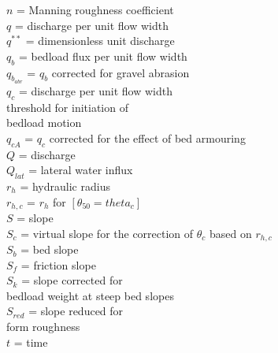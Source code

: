 \documentclass[11pt,a4paper]{article}
\begin{document}
\begin{multicols}{2}
$n$ = Manning roughness coefficient \vspace{1.5ex} \\
$q$ = discharge per unit flow width \vspace{1.5ex} \\
$q^{\ast\ast}$ = dimensionless unit discharge \vspace{1.5ex} \\
$q_b$ = bedload flux per unit flow width \vspace{1.5ex} \\
$q_{b_{abr}}$ = $q_b$ corrected for gravel abrasion \vspace{1.5ex} \\
$q_c$ = discharge per unit flow width\\threshold for initiation of\\bedload motion \vspace{1.5ex} \\
$q_{cA}$ = $q_c$ corrected for the effect of bed armouring \vspace{1.5ex} \\
$Q$ = discharge \vspace{1.5ex} \\
$Q_{lat}$ = lateral water influx \vspace{1.5ex} \\
$r_h$ = hydraulic radius \vspace{1.5ex} \\
$r_{h,c}$ = $r_h$ for $\left[\theta_{50}=theta_c\right]$ \vspace{1.5ex} \\
$S$ = slope \vspace{1.5ex} \\
$S_c$ = virtual slope for the correction of $\theta_{c}$ based on $r_{h,c}$ \vspace{1.5ex} \\
$S_b$ = bed slope \vspace{1.5ex} \\
$S_f$ = friction slope \vspace{1.5ex} \\
$S_k$ = slope corrected for\\bedload weight at steep bed slopes \vspace{1.5ex} \\
$S_{red}$ = slope reduced for\\form roughness \vspace{1.5ex} \\
$t$ = time \vspace{1.5ex} \\

\end{multicols}
\end{document}
